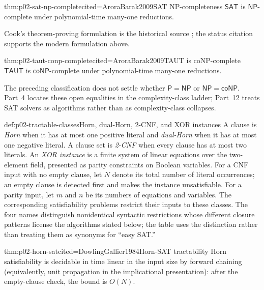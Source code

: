 \begin{hbtheorem}{thm:p02-sat-np-complete}{cited=AroraBarak2009}{SAT NP-completeness}
\(\mathsf{SAT}\) is \(\mathsf{NP}\)-complete under polynomial-time many-one
reductions.
\end{hbtheorem}

Cook's theorem-proving formulation is the historical source
\cite{Cook1971}; the status citation supports the modern formulation above.

\begin{hbcorollary}{thm:p02-taut-conp-complete}{cited=AroraBarak2009}{TAUT is coNP-complete}
\(\mathsf{TAUT}\) is \(\mathsf{coNP}\)-complete under polynomial-time
many-one reductions.
\end{hbcorollary}

The preceding classification does not settle whether
\(\mathsf P=\mathsf{NP}\) or \(\mathsf{NP}=\mathsf{coNP}\).  Part~4 locates
these open equalities in the complexity-class ladder; Part~12 treats SAT
solvers as algorithms rather than as complexity-class collapses.

\begin{hbdefinition}{def:p02-tractable-classes}{Horn, dual-Horn, 2-CNF, and XOR instances}
A clause is \emph{Horn} when it has at most one positive literal and
\emph{dual-Horn} when it has at most one negative literal.  A clause set is
\emph{2-CNF} when every clause has at most two literals.  An
\emph{XOR instance} is a finite system of linear equations over the
two-element field, presented as parity constraints on Boolean variables.
For a CNF input with no empty clause, let \(N\) denote its total number of
literal occurrences; an empty clause is detected first and makes the instance
unsatisfiable.  For a parity input, let \(m\) and \(n\) be its numbers of
equations and variables.
The corresponding satisfiability problems restrict their inputs to these
classes.  The four names distinguish nonidentical syntactic restrictions whose
different closure patterns license the algorithms stated below; the table uses
the distinction rather than treating them as synonyms for ``easy SAT.''
\end{hbdefinition}

\begin{hbtheorem}{thm:p02-horn-sat}{cited=DowlingGallier1984}{Horn-SAT tractability}
Horn satisfiability is decidable in time linear in the input size by forward
chaining (equivalently, unit propagation in the implicational presentation):
after the empty-clause check, the bound is \(O(N)\).
\end{hbtheorem}

